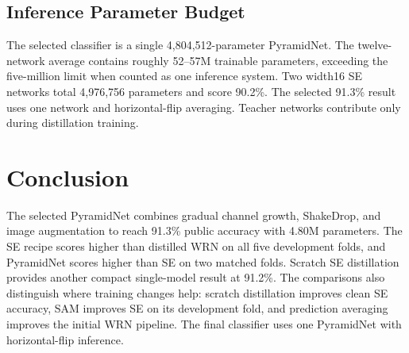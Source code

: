 \documentclass[letterpaper]{article} %
\begin{document}
\subsection{Inference Parameter Budget}
The selected classifier is a single 4,804,512-parameter PyramidNet. The twelve-network average contains roughly 52--57M trainable parameters, exceeding the five-million limit when counted as one inference system. Two width16 SE networks total 4,976,756 parameters and score 90.2\%. The selected 91.3\% result uses one network and horizontal-flip averaging. Teacher networks contribute only during distillation training.

\section{Conclusion}
The selected PyramidNet combines gradual channel growth, ShakeDrop, and image augmentation to reach 91.3\% public accuracy with 4.80M parameters. The SE recipe scores higher than distilled WRN on all five development folds, and PyramidNet scores higher than SE on two matched folds. Scratch SE distillation provides another compact single-model result at 91.2\%. The comparisons also distinguish where training changes help: scratch distillation improves clean SE accuracy, SAM improves SE on its development fold, and prediction averaging improves the initial WRN pipeline. The final classifier uses one PyramidNet with horizontal-flip inference.


\end{document}
